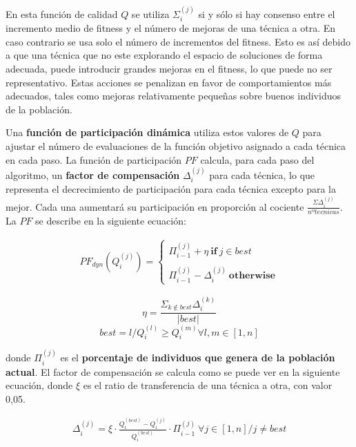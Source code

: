 En esta función de calidad $Q$ se utiliza $\Sigma_{i}^{(j)}$ si y sólo si hay consenso entre el incremento medio de fitness y el número de mejoras de una técnica a otra. En caso contrario se usa solo el número de incrementos del fitness. Esto es así debido a que una técnica que no este explorando el espacio de soluciones de forma adecuada, puede introducir grandes mejoras en el fitness, lo que puede no ser representativo. Estas acciones se penalizan en favor de comportamientos más adecuados, tales como mejoras relativamente pequeñas sobre buenos individuos de la población.

Una \textbf{función de participación dinámica} utiliza estos valores de $Q$ para ajustar el número de evaluaciones de la función objetivo asignado a cada técnica en cada paso. La función de participación $PF$ calcula, para cada paso del algoritmo, un \textbf{factor de compensación} $\Delta_i^{(j)}$ para cada técnica, lo que representa el decrecimiento de participación para cada técnica excepto para la mejor. Cada una aumentará su participación en proporción al cociente $\frac{\Sigma \Delta_{i}^{(j)}}{nº tecnicas}$. La $PF$ se describe en la siguiente ecuación:

\begin{equation}\label{eq:PF_MOS}
	\begin{gathered}
		PF_{dyn}(Q_i^{(j)} )= \begin{cases}
			\Pi_{i-1}^{(j)} + \eta \ \textbf{if} \ j \in best \\ \\
			\Pi_{i-1}^{(j)} - \Delta_i^{(j)} \ \textbf{otherwise}
		\end{cases}
	\end{gathered}
\end{equation}

$$
\eta = \frac{\Sigma_{k\notin best}\Delta_i^{(k)}}{|best|}
$$
$$
best = {l/Q_i^{(l)} \geq Q_i^{(m)} \forall l,m \in [1,n]}
$$

donde $\Pi_i^{(j)}$ es el \textbf{porcentaje de individuos que genera de la población actual}. El factor de compensación se calcula como se puede ver en la siguiente ecuación, donde $\xi$ es el ratio de transferencia de una técnica a otra, con valor 0,05.

\begin{equation}\label{eq:RatioCompensacion}
	\begin{gathered}
		\Delta_i^{(j)} = \xi \cdot \frac{Q_i^{(best)} - Q_i^{(j)}} {Q_i^{(best)}} \cdot \Pi_{i-1}^{(j)} \ \forall j \in [1,n]/j \neq best
	\end{gathered}
\end{equation}

